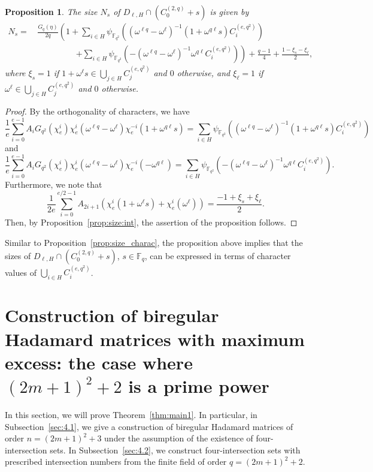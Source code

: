 \documentclass[10pt]{amsart}
\newtheorem{prop}[theo]{Proposition}
\theoremstyle{definition}
\newcommand*\F{{\mathbb F}}
\begin{document}
\begin{prop}\label{prop:size:int2}
The size $N_s$ of $D_{\ell,H}\cap (C_0^{(2,q)}+s)$ is given by
\begin{align*}
N_s=&\, \frac{G_q(\eta)}{2q}\left(1+
\sum_{i\in H}\psi_{\F_{q^2}}((\omega^{\ell q}-\omega^\ell)^{-1}(1+\omega^{q\ell} s)C_i^{(e,q^2)})\right.\\
&\hspace{2cm}\left.+\sum_{i\in H}\psi_{\F_{q^2}}(-(\omega^{\ell q}-\omega^\ell)^{-1}\omega^{q\ell}C_i^{(e,q^2)})\right) +\frac{q-1}{4}+\frac{1-\xi_s-\xi_\ell}{2},
\end{align*}
where $\xi_s=1$ if $1+\omega^\ell s\in \bigcup_{j\in H}C_j^{(e,q^2)}$ and $0$ otherwise, and $\xi_\ell=1$ if $\omega^\ell\in \bigcup_{j\in H}C_j^{(e,q^2)}$ and $0$ otherwise.
\end{prop}
\begin{proof}
By the orthogonality of characters, we have
\[
\frac{1}{e}\sum_{i=0}^{e-1}A_{i} G_{q^2}(\chi_e^{i})\chi_e^{i}(\omega^{\ell q}-\omega^\ell)
\chi_e^{-i}(1+\omega^{q\ell} s)=
\sum_{i\in H}\psi_{\F_{q^2}}((\omega^{\ell q}-\omega^\ell)^{-1}(1+\omega^{q\ell} s)C_i^{(e,q^2)})
\]
and
\[
\frac{1}{e}\sum_{i=0}^{e-1}A_{i} G_{q^2}(\chi_e^{i})\chi_e^{i}(\omega^{\ell q}-\omega^\ell)
\chi_e^{-i}(-\omega^{q\ell})=
\sum_{i\in H}\psi_{\F_{q^2}}(-(\omega^{\ell q}-\omega^\ell)^{-1}\omega^{q\ell}C_i^{(e,q^2)}).
\]
Furthermore, we note that
\[
\frac{1}{2e}\sum_{i=0}^{e/2-1}A_{2i+1}(\chi_e^i(1+\omega^\ell s)+\chi_e^i(\omega^\ell))=\frac{-1+\xi_s+\xi_\ell}{2}.
\]
Then, by Proposition~\ref{prop:size:int}, the assertion of the proposition follows.
\end{proof}

\vspace{0.3cm}

Similar to Proposition~\ref{prop:size_charac}, the proposition above implies that the sizes of $D_{\ell,H}\cap (C_0^{(2,q)}+s)$, $s\in \F_q$, can be expressed in terms of character values of $\bigcup_{i\in H}C_i^{(e,q^2)}$.

\section{Construction of biregular Hadamard matrices with maximum excess: the case where \texorpdfstring{$(2m+1)^2+2$}{(2m+1)2+2} is a prime power}\label{sec:const1}
In this section, we will prove Theorem~\ref{thm:main1}. In particular, in Subsection~\ref{sec:4.1}, we give a construction of biregular Hadamard matrices of order $n=(2m+1)^2+3$ under the assumption of the existence of four-intersection sets. In Subsection~\ref{sec:4.2}, we construct four-intersection sets with prescribed intersection numbers from the finite field of order $q=(2m+1)^2+2$.
\end{document}
